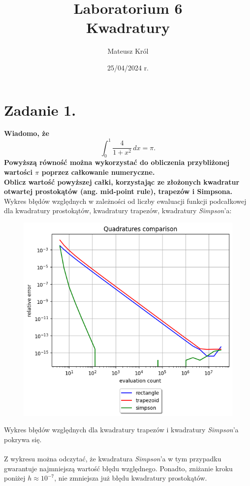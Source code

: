 \documentclass{article}
\title{%
Laboratorium 6\\
  \huge Kwadratury}
\author{Mateusz Król}
\date{25/04/2024 r.}
\begin{document}
\maketitle

 
\section*{Zadanie 1.}
\textbf{Wiadomo, że $$ \int_{0}^{1} \frac{4}{1+x^2} \,dx = \pi.$$
\quad
Powyższą równość można wykorzystać do obliczenia przybliżonej
wartości $\pi$ poprzez całkowanie numeryczne. \\
\null\quad
Oblicz wartość powyższej całki, korzystając ze
złożonych kwadratur otwartej prostokątów (ang. mid-point rule), 
trapezów i Simpsona.}
\newpage
Wykres błędów względnych w zależności od liczby ewaluacji
funkcji podcałkowej dla kwadratury prostokątów, kwadratury trapezów,
kwadratury \textit{Simpson}'a:
\begin{figure}[H]
  \includegraphics[width=\linewidth]{figures/quad.png}
\end{figure}
Wykres błędów względnych dla kwadratury trapezów i kwadratury \textit{Simpson}'a
pokrywa się.
\\\\
\null\quad
Z wykresu można odczytać, że kwadratura \textit{Simpson}'a
w tym przypadku gwarantuje najmniejszą wartość błędu
względnego. Ponadto, zniżanie kroku poniżej $h \approx 10^{-7}$, 
nie zmniejsza już błędu kwadratury prostokątów. \\
\end{document}
